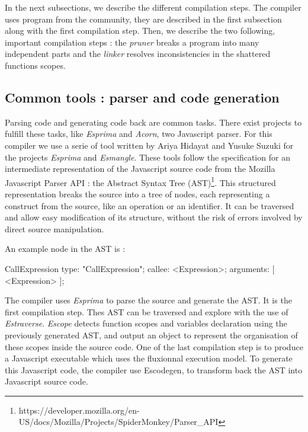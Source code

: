 In the next subsections, we describe the different compilation steps.
The compiler uses program from the community, they are described in the first subsection along with the first compilation step.
Then, we describe the two following, important compilation steps : the \textit{pruner} breaks a program into many independent parts and the \textit{linker} resolves inconsistencies in the shattered functions scopes.


\subsection{Common tools : parser and code generation}

Parsing code and generating code back are common tasks.
There exist projects to fulfill these tasks, like \textit{Esprima} and \textit{Acorn}, two Javascript parser.
For this compiler we use a serie of tool written by Ariya Hidayat and Yusuke Suzuki for the projects \textit{Esprima} and \textit{Esmangle}.
These tools follow the specification for an intermediate representation of the Javascript source code from the Mozilla Javascript Parser API : the Abstract Syntax Tree (AST)\footnote{\raggedright https://developer.mozilla.org/en-US/docs/Mozilla/Projects/SpiderMonkey/Parser\_API}.
This structured representation breaks the source into a tree of nodes, each representing a construct from the source, like an operation or an identifier.
It can be traversed and allow easy modification of its structure, without the risk of errors involved by direct source manipulation.

An example node in the AST is :

\begin{code}[Javascript, caption={Example of an AST node},label={lst:astnode}]
CallExpression {
    type: "CallExpression";
    callee: <Expression>;
    arguments: [ <Expression> ];
}
\end{code}

The compiler uses \textit{Esprima} to parse the source and generate the AST.
It is the first compilation step.
Thes AST can be traversed and explore with the use of \textit{Estraverse}.
\textit{Escope} detects function scopes and variables declaration using the previously generated AST, and output an object to represent the organisation of these scopes inside the source code.
One of the last compilation step is to produce a Javascript executable which uses the fluxionnal execution model.
To generate this Javascript code, the compiler use Escodegen, to transform back the AST into Javascript source code.

